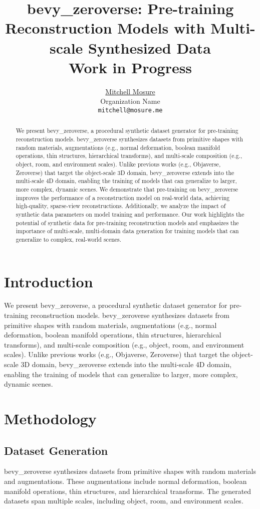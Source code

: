 \documentclass{article}
\title{bevy\_zeroverse: Pre-training Reconstruction Models with Multi-scale Synthesized Data \\ \large{\textbf{Work in Progress}}}
\author{ \href{https://orcid.org/0009-0009-8476-3358}{\hspace{1mm}Mitchell Mosure} \\
    Organization Name\\
    \texttt{mitchell@mosure.me} \\
}
\begin{document}
\maketitle

\begin{abstract}
We present bevy\_zeroverse, a procedural synthetic dataset generator for pre-training reconstruction models. bevy\_zeroverse synthesizes datasets from primitive shapes with random materials, augmentations (e.g., normal deformation, boolean manifold operations, thin structures, hierarchical transforms), and multi-scale composition (e.g., object, room, and environment scales). Unlike previous works (e.g., Objaverse, Zeroverse) that target the object-scale 3D domain, bevy\_zeroverse extends into the multi-scale 4D domain, enabling the training of models that can generalize to larger, more complex, dynamic scenes. We demonstrate that pre-training on bevy\_zeroverse improves the performance of a reconstruction model on real-world data, achieving high-quality, sparse-view reconstructions. Additionally, we analyze the impact of synthetic data parameters on model training and performance. Our work highlights the potential of synthetic data for pre-training reconstruction models and emphasizes the importance of multi-scale, multi-domain data generation for training models that can generalize to complex, real-world scenes.
\end{abstract}

\section{Introduction}
We present bevy\_zeroverse, a procedural synthetic dataset generator for pre-training reconstruction models. bevy\_zeroverse synthesizes datasets from primitive shapes with random materials, augmentations (e.g., normal deformation, boolean manifold operations, thin structures, hierarchical transforms), and multi-scale composition (e.g., object, room, and environment scales). Unlike previous works (e.g., Objaverse, Zeroverse) that target the object-scale 3D domain, bevy\_zeroverse extends into the multi-scale 4D domain, enabling the training of models that can generalize to larger, more complex, dynamic scenes.

\section{Methodology}
\subsection{Dataset Generation}
bevy\_zeroverse synthesizes datasets from primitive shapes with random materials and augmentations. These augmentations include normal deformation, boolean manifold operations, thin structures, and hierarchical transforms. The generated datasets span multiple scales, including object, room, and environment scales.
\end{document}
